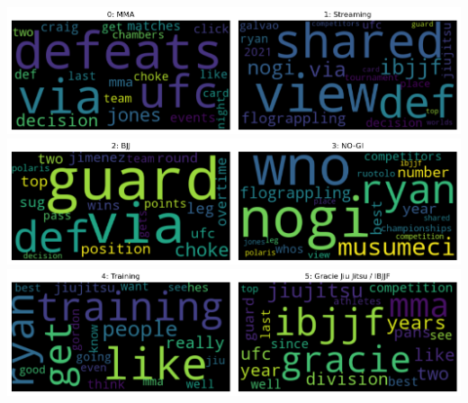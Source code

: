 \includegraphics[width=0.5\textwidth]{images/gi0.png}\includegraphics[width=0.5\textwidth]{images/gi1.png} \\
\includegraphics[width=0.5\textwidth]{images/gi2.png}\includegraphics[width=0.5\textwidth]{images/gi3.png} \\
\includegraphics[width=0.5\textwidth]{images/gi4.png}\includegraphics[width=0.5\textwidth]{images/gi5.png} \\

